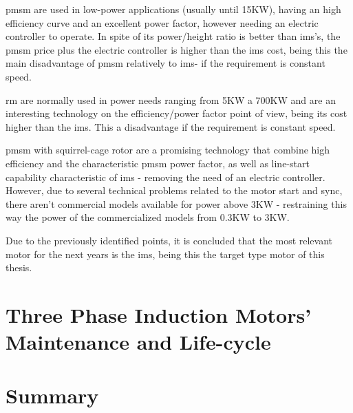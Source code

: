 \acrshort{pmsm} are used in low-power applications (usually until 15KW), having an high efficiency curve and an excellent power factor, however needing an electric controller to operate. In spite of its power/height ratio is better than \acrshort{ims}'s, the \acrshort{pmsm} price plus the electric controller is higher than the \acrshort{ims} cost, being this the main disadvantage of \acrshort{pmsm} relatively to \acrshort{ims}- if the requirement is constant speed.

\acrshort{rm} are normally used in power needs ranging from 5KW a 700KW and are an interesting technology on the efficiency/power factor point of view, being its cost higher than the \acrshort{ims}. This a disadvantage if the requirement is constant speed.

\acrshort{pmsm} with squirrel-cage rotor are a promising technology that combine high efficiency and the characteristic \acrshort{pmsm} power factor, as well as line-start capability characteristic of \acrshort{ims} - removing the need of an electric controller.
However, due to several technical problems related to the motor start and sync, there aren't commercial models available for power above 3KW - restraining this way the power of the commercialized models from 0.3KW to 3KW.

Due to the previously identified points, it is concluded that the most relevant motor for the next years is the \acrshort{ims}, being this the target type motor of this thesis.

\section{Three Phase Induction Motors' Maintenance and Life-cycle} %
\label{sec:Three_phase_induction_motors_maintenance_and_lyfe_cycle}

\section{Summary} %
\label{sec:tpem_summary}
